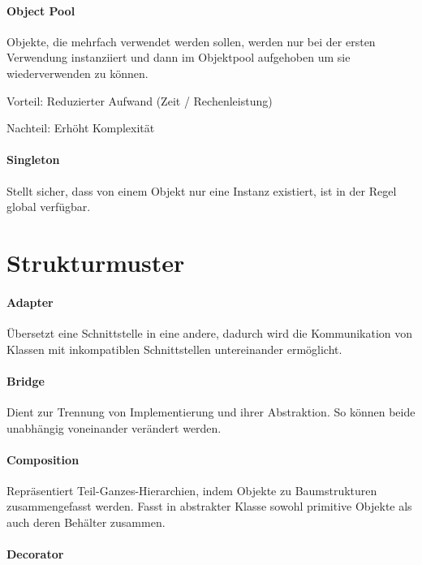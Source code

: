 \paragraph{Object Pool}\label{object-pool}

Objekte, die mehrfach verwendet werden sollen, werden nur bei der ersten
Verwendung instanziiert und dann im Objektpool aufgehoben um sie
wiederverwenden zu können.

Vorteil: Reduzierter Aufwand (Zeit / Rechenleistung)

Nachteil: Erhöht Komplexität

\paragraph{Singleton}\label{singleton}

Stellt sicher, dass von einem Objekt nur eine Instanz existiert, ist in der
Regel global verfügbar.

\section{Strukturmuster}\label{strukturmuster}

\paragraph{Adapter}\label{adapter}

Übersetzt eine Schnittstelle in eine andere, dadurch wird die Kommunikation von
Klassen mit inkompatiblen Schnittstellen untereinander ermöglicht.

\paragraph{Bridge}\label{bridge}

Dient zur Trennung von Implementierung und ihrer Abstraktion. So können beide
unabhängig voneinander verändert werden.

\paragraph{Composition}\label{composition}

Repräsentiert Teil-Ganzes-Hierarchien, indem Objekte zu Baumstrukturen
zusammengefasst werden. Fasst in abstrakter Klasse sowohl primitive Objekte als
auch deren Behälter zusammen.

\paragraph{Decorator}\label{decorator}

